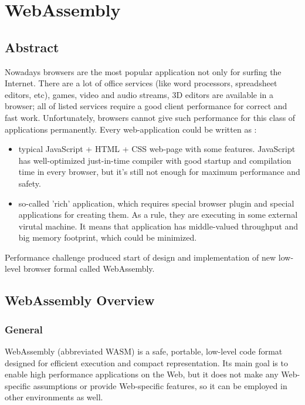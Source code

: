 \chapter{WebAssembly}

\section{Abstract}

Nowadays browsers are the most popular application not only for surfing the Internet. 
There are a lot of office services (like word processors, spreadsheet editors, etc), games, video and audio streams, 3D editors are available in a browser; 
all of listed services require a good client performance for correct and fast work. 
Unfortunately, browsers cannot give such performance for this class of applications permanently.
Every web-application could be written as :
\begin{itemize}  
  \item typical JavaScript + HTML + CSS web-page with some features. 
        JavaScript has well-optimized just-in-time compiler with good startup and compilation time in every browser, but it's still not enough for maximum performance and safety.
  \item so-called 'rich' application, which requires special browser plugin and special applications for creating them. As a rule, they are executing in some external virutal machine. 
        It means that application has middle-valued throughput and big memory footprint, which could be minimized.
\end{itemize}

Performance challenge produced start of design and implementation of new low-level browser formal called WebAssembly.

\section{WebAssembly Overview} \cite{wasm1}
\subsection{General} \mbox{}

\indent WebAssembly (abbreviated WASM) is a safe, portable, low-level code format designed for efficient execution and compact representation. 
Its main goal is to enable high performance applications on the Web, but it does not make any Web-specific assumptions or provide Web-specific features, so it can be employed in other environments as well.

